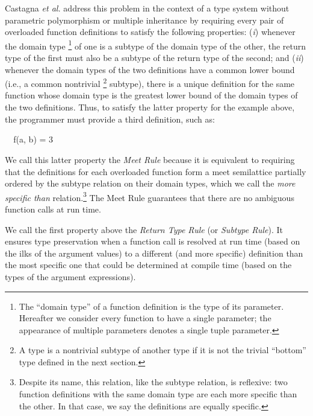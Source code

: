 \documentclass[10pt]{sigplanconf}
\begin{document}
Castagna \textit{et al.} \cite{castagna95} address this problem 
in the context of a type system 
without parametric polymorphism or multiple inheritance
by requiring every pair of overloaded function definitions 
to satisfy the following properties:
(\emph{i}) whenever the domain type%
\footnote{The ``domain type'' of a function definition is the type of its
parameter. Hereafter we consider every function to have a single parameter;
the appearance of multiple parameters denotes a single tuple parameter.}
of one 
is a subtype of the domain type of the other, 
the return type of the first
must also be a subtype of the return type of the second; 
and 
(\emph{ii}) whenever the domain types of the two definitions 
have a common lower bound (i.e., a common nontrivial%
\footnote{A type is a nontrivial subtype of another type if it is not the
trivial ``bottom'' type defined in the next section.}
 subtype), 
there is a unique definition for the same function 
whose domain type is the greatest lower bound 
of the domain types of the two definitions.
Thus, 
to satisfy the latter property for the example above, 
the programmer must provide a third definition, such as:

\small
\begin{FortressCode}
{\tt ~~}\+f(a\COLON {}, b\COLON {})\COLON {} = 3\-
\end{FortressCode}
\normalsize

We call this latter property the \emph{Meet Rule} 
because it is equivalent to requiring
that the definitions for each overloaded function form a meet semilattice 
partially ordered by the subtype relation on their domain types, 
which we call the \emph{more specific than} relation.\!\footnote{%
Despite its name,
this relation, like the subtype relation, is reflexive: 
two function definitions with the same domain type 
are each more specific than the other.
In that case, we say the definitions are equally specific.}
The Meet Rule guarantees 
that there are no ambiguous function calls at run time.

We call the first property above the \emph{Return Type Rule}
(or \emph{Subtype Rule}).
It ensures type preservation 
when a function call is resolved at run time 
(based on the ilks of the argument values) 
to a different (and more specific) definition 
than the most specific one that could be determined at compile time 
(based on the types of the argument expressions).
\end{document}
